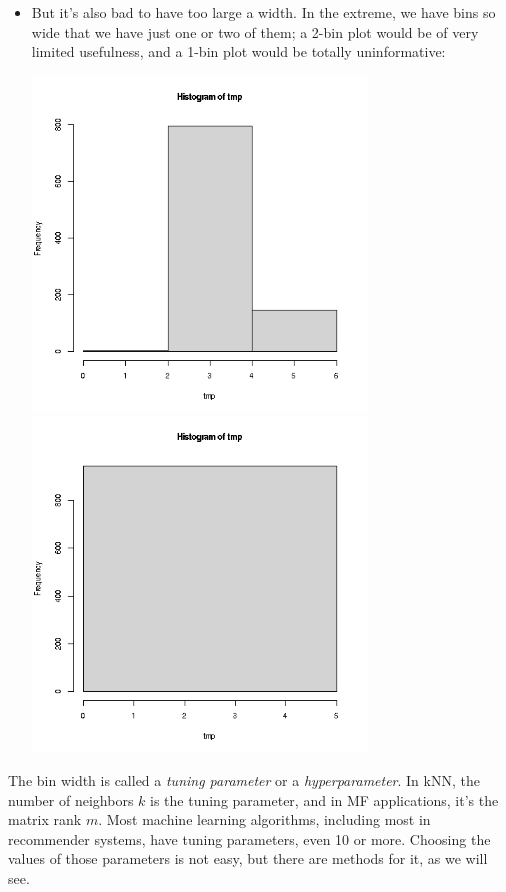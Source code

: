 \begin{itemize}
\item But it's also bad to have too large a width.  In the extreme, we
have bins so wide that we have just one or two of them; a 2-bin plot
would be of very limited usefulness, and a 1-bin plot would be
totally uninformative:

\includegraphics[width=3.5in]{Images/HistBrks2.png} 
\includegraphics[width=3.5in]{Images/HistBrks1.png} 

\end{itemize} 

The bin width is called a \textit{tuning parameter} or a
\textit{hyperparameter}.  In kNN, the number of neighbors $k$ is the
tuning parameter, and in MF applications, it's the matrix rank $m$.
Most machine learning algorithms, including most in recommender systems,
have tuning parameters, even 10 or more.  Choosing the values of those
parameters is not easy, but there are methods for it, as we will see.

